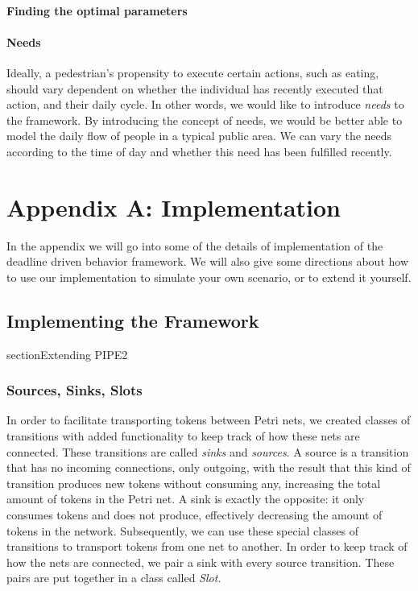 \documentclass[11pt]{book}
\begin{document}
\subsubsection{Finding the optimal parameters}

\subsubsection{Needs}
Ideally, a pedestrian's propensity to execute certain actions, such as eating, should vary dependent on whether the individual has recently executed that action, and their daily cycle. In other words, we would like to introduce \emph{needs} to the framework. By introducing the concept of needs, we would be better able to model the daily flow of people in a typical public area. We can vary the needs according to the time of day and whether this need has been fulfilled recently.

\appendix

\chapter{Appendix A: Implementation}
In the appendix we will go into some of the details of implementation of the deadline driven behavior framework. We will also give some directions about how to use our implementation to simulate your own scenario, or to extend it yourself.


\section{Implementing the Framework}


section{Extending PIPE2}

\subsection{Sources, Sinks, Slots}
In order to facilitate transporting tokens between Petri nets, we created classes of transitions with added functionality to keep track of how these nets are connected. These transitions are called \emph{sinks} and \emph{sources}. A source is a transition that has no incoming connections, only outgoing, with the result that this kind of transition produces new tokens without consuming any, increasing the total amount of tokens in the Petri net. A sink is exactly the opposite: it only consumes tokens and does not produce, effectively decreasing the amount of tokens in the network. Subsequently, we can use these special classes of transitions to transport tokens from one net to another. In order to keep track of how the nets are connected, we pair a sink with every source transition. These pairs are put together in a class called \emph{Slot}.
\end{document}
